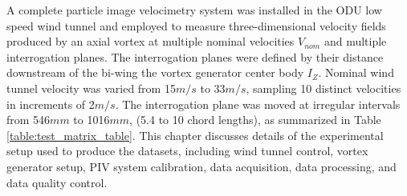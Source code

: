 A complete particle image velocimetry system was installed in the ODU low speed 
wind tunnel and employed to measure three-dimensional velocity fields produced 
by an axial vortex at multiple nominal velocities $V_{nom}$ and multiple 
interrogation planes. The interrogation planes were defined by their 
distance downstream of the bi-wing the vortex generator center body
$I_Z$. Nominal wind tunnel velocity was varied from 15$m/s$ to 33$m/s$, 
sampling 10 distinct velocities in increments of 2$m/s$. The interrogation 
plane was moved at irregular intervals from 546$mm$ to 1016$mm$, (5.4 to 10 
chord lengths), as summarized in Table \ref{table:test_matrix_table}. This 
chapter 
discusses details of the experimental setup used to produce the datasets, 
including wind tunnel control, vortex generator setup, PIV system calibration, 
data acquisition, data processing, and data quality control.